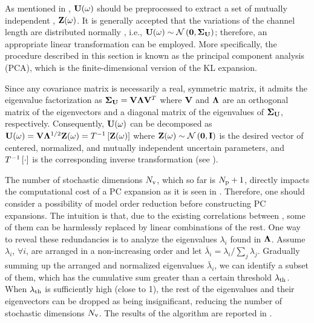 As mentioned in , $\mathbf{U}(\omega)$ should be preprocessed to extract a set of mutually independent \rvs, $\mathbf{Z}(\omega)$. It is generally accepted that the variations of the channel length are distributed normally \cite{juan2011, juan2012, srivastava2010}, i.e., $\vU(\o) \sim \normal{\vZero}{\mCov_\vU}$; therefore, an appropriate linear transformation can be employed. More specifically, the procedure described in this section is known as the principal component analysis (PCA), which is the finite-dimensional version of the KL expansion.

Since any covariance matrix is necessarily a real, symmetric matrix, it admits the eigenvalue factorization \cite{press2007} as $\mCov_\vU = \m{V} \m{\Lambda} \m{V}^T$ where $\m{V}$ and $\m{\Lambda}$ are an orthogonal matrix of the eigenvectors and a diagonal matrix of the eigenvalues of $\mCov_\vU$, respectively. Consequently, $\mathbf{U}(\omega)$ can be decomposed as $\vU(\o) = \m{V} \m{\Lambda}^\ifrac{1}{2} \vZ(\o) = \oInvTransform{\vZ(\o)}$ where $\vZ(\o) \sim \normal{\vZero}{\mI}$ is the desired vector of centered, normalized, and mutually independent uncertain parameters, and $T^{-1}\left[\cdot\right]$ is the corresponding inverse transformation (see ).

The number of stochastic dimensions ${N_\text{v}}$, which so far is ${N_\text{p}} + 1$, directly impacts the computational cost of a PC expansion as it is seen in . Therefore, one should consider a possibility of model order reduction before constructing PC expansions. The intuition is that, due to the existing correlations between \rvs, some of them can be harmlessly replaced by linear combinations of the rest. One way to reveal these redundancies is to analyze the eigenvalues $\lambda_i$ found in $\m{\Lambda}$. Assume $\lambda_i$, $\forall i$, are arranged in a non-increasing order and let $\bar{\lambda}_i = \lambda_i / \sum_j \lambda_j$. Gradually summing up the arranged and normalized eigenvalues $\bar{\lambda}_i$, we can identify a subset of them, which has the cumulative sum greater than a certain threshold $\lambda_\text{th}$. When $\lambda_\text{th}$ is sufficiently high (close to 1), the rest of the eigenvalues and their eigenvectors can be dropped as being insignificant, reducing the number of stochastic dimensions ${N_\text{v}}$. The results of the algorithm are reported in .
